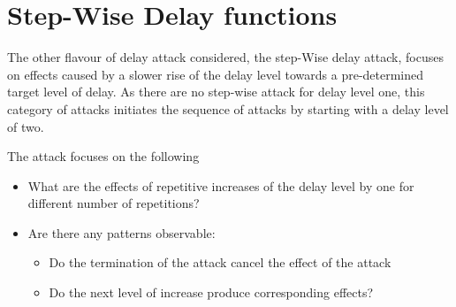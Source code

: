 \newpage
\section{Step-Wise Delay functions}
The other flavour of delay attack considered, the step-Wise delay attack, focuses on effects caused by a slower rise of the delay level towards a pre-determined target level of delay. As there are no step-wise attack for delay level one, this category of attacks initiates the sequence of attacks by starting with a delay level of two.

The attack focuses on the following 
\begin{itemize}
\item What are the effects of repetitive increases of the delay level by one for different number of repetitions?
\item Are there any patterns observable:
\begin{itemize}
    \item Do the termination of the attack cancel the effect of the attack
    \item Do the next level of increase produce corresponding effects? 
\end{itemize}

\end{itemize}

















